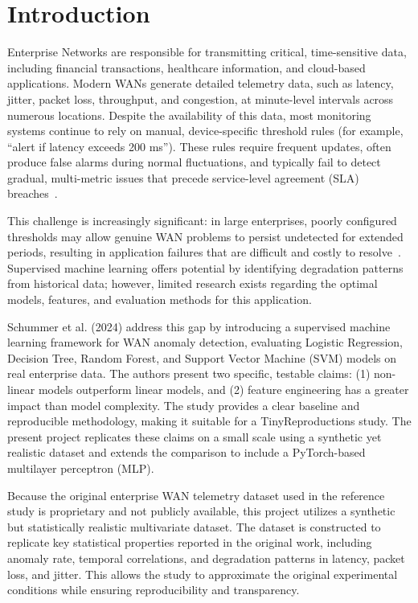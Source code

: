 \documentclass{article}
\begin{document}
\section{Introduction}
\label{sec:intro}
Enterprise Networks are responsible for transmitting critical, time-sensitive data, 
including financial transactions, healthcare information, and cloud-based applications. 
Modern WANs generate detailed telemetry data, such as latency, jitter, packet loss, 
throughput, and congestion, at minute-level intervals across numerous locations. 
Despite the availability of this data, most monitoring systems continue to rely on manual, 
device-specific threshold rules (for example, “alert if latency exceeds 200 ms”). 
These rules require frequent updates, often produce false alarms during normal fluctuations, 
and typically fail to detect gradual, multi-metric issues that precede service-level 
agreement (SLA) breaches~\citep{schummer2024}.

This challenge is increasingly significant: in large enterprises, poorly configured thresholds 
may allow genuine WAN problems to persist undetected for extended periods, resulting in 
application failures that are difficult and costly to resolve~\citep{chandola2009}. 
Supervised machine learning offers potential by identifying degradation patterns from historical 
data; however, limited research exists regarding the optimal models, features, and evaluation 
methods for this application. 

Schummer et al. (2024) address this gap by introducing a supervised machine learning 
framework for WAN anomaly detection, evaluating Logistic Regression, Decision Tree, 
Random Forest, and Support Vector Machine (SVM) models on real enterprise data. The authors 
present two specific, testable claims: (1) non-linear models outperform linear models, 
and (2) feature engineering has a greater impact than model complexity. The study provides 
a clear baseline and reproducible methodology, making it suitable for a TinyReproductions 
study. The present project replicates these claims on a small scale using a synthetic yet 
realistic dataset and extends the comparison to include a PyTorch-based multilayer perceptron (MLP).

Because the original enterprise WAN telemetry dataset used in the reference study is proprietary 
and not publicly available, this project utilizes a synthetic but statistically realistic 
multivariate dataset. The dataset is constructed to replicate key statistical properties reported 
in the original work, including anomaly rate, temporal correlations, and degradation patterns in 
latency, packet loss, and jitter. This allows the study to approximate the original experimental 
conditions while ensuring reproducibility and transparency.
\end{document}

